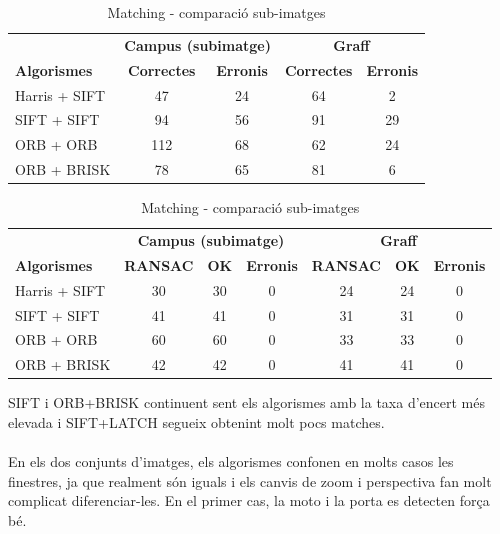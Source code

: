 		\begin{table}[H]
			\begin{center}
				\begin{tabular}{l | c c | c c}
					& \multicolumn{2}{c|}{\textbf{Campus (subimatge)}} & \multicolumn{2}{c}{\textbf{Graff}} \\
					\textbf{Algorismes} & \textbf{Correctes} & \textbf{Erronis} & \textbf{Correctes} & \textbf{Erronis} \\ \hline
					Harris + SIFT & 47 & 24 & 64 & 2 \\
					SIFT + SIFT & 94 & 56 & 91 & 29 \\
					ORB + ORB & 112 & 68 & 62 & 24 \\
					ORB + BRISK & 78 & 65 & 81 & 6 \\
				\end{tabular}
			\end{center}
			\caption{Matching - comparació sub-imatges}
		\end{table}

		\begin{table}[H]
			\begin{center}
				\begin{tabular}{l | c c c | c c c}
					& \multicolumn{3}{c|}{\textbf{Campus (subimatge)}} & \multicolumn{3}{c}{\textbf{Graff}} \\
					\textbf{Algorismes} & \textbf{RANSAC} & \textbf{OK} & \textbf{Erronis} & \textbf{RANSAC} & \textbf{OK} & \textbf{Erronis} \\ \hline
					Harris + SIFT & 30 & 30 & 0 & 24 & 24 & 0 \\
					SIFT + SIFT & 41 & 41 & 0 & 31 & 31 & 0 \\
					ORB + ORB & 60 & 60 & 0 & 33 & 33 & 0 \\
					ORB + BRISK & 42 & 42 & 0 & 41 & 41 & 0 \\
				\end{tabular}
			\end{center}
			\caption{Matching - comparació sub-imatges}
		\end{table}
		\noindent
		SIFT i ORB+BRISK continuent sent els algorismes amb la taxa d'encert més elevada i SIFT+LATCH segueix obtenint molt pocs matches.\\\\
		En els dos conjunts d'imatges, els algorismes confonen en molts casos
		les finestres, ja que realment són iguals i els canvis de zoom i perspectiva fan molt complicat diferenciar-les. En el primer cas, la moto i la porta es detecten força bé.

